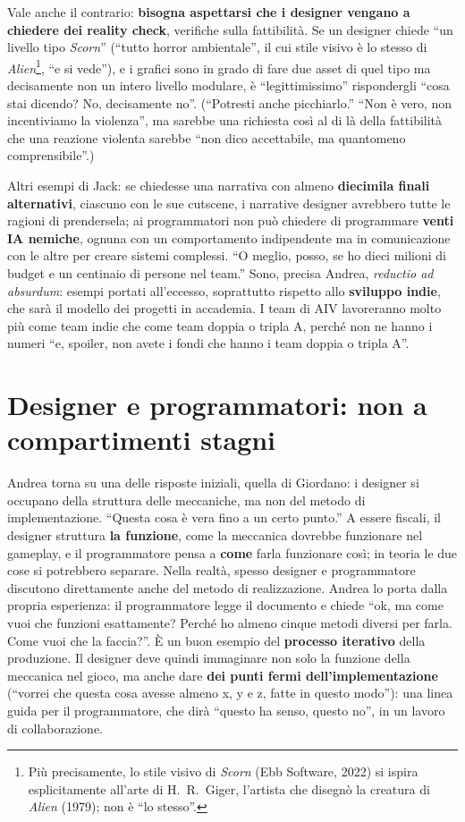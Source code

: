 Vale anche il contrario: \textbf{bisogna aspettarsi che i designer vengano a
chiedere dei reality check}, verifiche sulla fattibilità. Se un designer
chiede ``un livello tipo \emph{Scorn}'' (``tutto horror ambientale'', il cui
stile visivo è lo stesso di \emph{Alien}\footnote{Più precisamente, lo stile
visivo di \emph{Scorn} (Ebb Software, 2022) si ispira esplicitamente
all'arte di H.~R.~Giger, l'artista che disegnò la creatura di \emph{Alien}
(1979); non è ``lo stesso''.}, ``e si vede''), e i grafici sono in grado di
fare due asset di quel tipo ma decisamente non un intero livello modulare, è
``legittimissimo'' rispondergli ``cosa stai dicendo? No, decisamente no''.
(``Potresti anche picchiarlo.'' ``Non è vero, non incentiviamo la violenza'',
ma sarebbe una richiesta così al di là della fattibilità che una reazione
violenta sarebbe ``non dico accettabile, ma quantomeno comprensibile''.)

Altri esempi di Jack: se chiedesse una narrativa con almeno
\textbf{diecimila finali alternativi}, ciascuno con le sue cutscene, i
narrative designer avrebbero tutte le ragioni di prendersela; ai
programmatori non può chiedere di programmare \textbf{venti IA nemiche},
ognuna con un comportamento indipendente ma in comunicazione con le altre
per creare sistemi complessi. ``O meglio, posso, se ho dieci milioni di
budget e un centinaio di persone nel team.'' Sono, precisa Andrea,
\emph{reductio ad absurdum}: esempi portati all'eccesso, soprattutto rispetto
allo \textbf{sviluppo indie}, che sarà il modello dei progetti in accademia.
I team di AIV lavoreranno molto più come team indie che come team doppia o
tripla A, perché non ne hanno i numeri ``e, spoiler, non avete i fondi che
hanno i team doppia o tripla A''.

\section{Designer e programmatori: non a compartimenti stagni}
\label{p2:sec:programmatori}

Andrea torna su una delle risposte iniziali, quella di Giordano: i designer
si occupano della struttura delle meccaniche, ma non del metodo di
implementazione. ``Questa cosa è vera fino a un certo punto.'' A essere
fiscali, il designer struttura \textbf{la funzione}, come la meccanica
dovrebbe funzionare nel gameplay, e il programmatore pensa a \textbf{come}
farla funzionare così; in teoria le due cose si potrebbero separare. Nella
realtà, spesso designer e programmatore discutono direttamente anche del
metodo di realizzazione. Andrea lo porta dalla propria esperienza: il
programmatore legge il documento e chiede ``ok, ma come vuoi che funzioni
esattamente? Perché ho almeno cinque metodi diversi per farla. Come vuoi che
la faccia?''. È un buon esempio del \textbf{processo iterativo} della
produzione. Il designer deve quindi immaginare non solo la funzione della
meccanica nel gioco, ma anche dare \textbf{dei punti fermi
dell'implementazione} (``vorrei che questa cosa avesse almeno x, y e z, fatte
in questo modo''): una linea guida per il programmatore, che dirà ``questo ha
senso, questo no'', in un lavoro di collaborazione.

